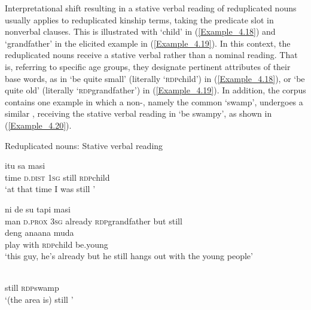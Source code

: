Interpretational shift resulting in a stative verbal reading of reduplicated nouns usually applies to reduplicated kinship terms, taking the predicate slot in nonverbal clauses. This is illustrated with  ‘child’ in (\ref{Example_4.18}) and  ‘grandfather’ in the elicited example in (\ref{Example_4.19}). In this context, the reduplicated nouns receive a stative verbal rather than a nominal reading. That is, referring to specific age groups, they designate pertinent attributes of their base words, as in  ‘be quite small’ (literally ‘\textsc{rdp}{\Tilde}child’) in (\ref{Example_4.18}), or  ‘be quite old’ (literally ‘\textsc{rdp}{\Tilde}grandfather’) in (\ref{Example_4.19}). In addition, the corpus contains one example in which a non-, namely the common   ‘swamp’, undergoes a similar , receiving the stative verbal reading in  ‘be swampy’, as shown in (\ref{Example_4.20}).


\begin{styleExampleTitle}
Reduplicated nouns: Stative verbal reading
\end{styleExampleTitle}

\ea
\label{Example_4.18}
 {itu} {sa} {masi} {}\\ %
 time  \textsc{d.dist}  \textsc{1sg}  still  \textsc{rdp}{\Tilde}child\\
\glt 
‘at that time I was still ’ \textstyleExampleSource{[080922-008-CvNP.0004]}
\z

\ea
\label{Example_4.19}
 {{ni}} {de} {{su}} {} {tapi} {masi}\\ %
 man  {\textsc{d.prox}}  \textsc{3sg}  {already}  \textsc{rdp}{\Tilde}grandfather  but  still\\
   deng  {ana{\Tilde}ana}  {muda}\\
 {play}  with  {\textsc{rdp}{\Tilde}child}  {be.young}\\
\glt 
‘this guy, he’s already  but he still hangs out with the young people’ \textstyleExampleSource{[Elicited BR120813.003]}
\z

\ea
\label{Example_4.20}
 {}\\ %
 still  \textsc{rdp}{\Tilde}swamp\\
 ‘(the area is) still ’ \textstyleExampleSource{[081006-033-Cv.0027]}
\z


